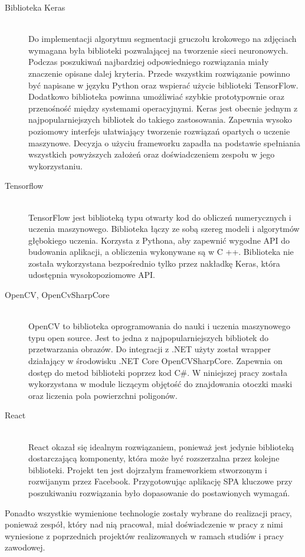 \documentclass[a4paper,11pt,twoside]{report}
\theoremstyle{definition}
\begin{document}
\begin{description}
\item [Biblioteka Keras] \hfill \\
Do implementacji algorytmu segmentacji gruczołu krokowego na zdjęciach wymagana była biblioteki pozwalającej na tworzenie sieci neuronowych. Podczas poszukiwań najbardziej odpowiedniego rozwiązania miały znaczenie opisane dalej kryteria. Przede wszystkim rozwiązanie powinno być napisane w języku Python oraz wspierać użycie biblioteki TensorFlow. Dodatkowo biblioteka powinna umożliwiać szybkie prototypownie oraz przenośność między systemami operacyjnymi. Keras jest obecnie jednym z najpopularniejszych bibliotek do takiego zastosowania. Zapewnia wysoko poziomowy interfejs ułatwiający tworzenie rozwiązań opartych o uczenie maszynowe. Decyzja o użyciu frameworku zapadła na podstawie spełniania wszystkich powyższych założeń oraz doświadczeniem zespołu w jego wykorzystaniu.
\item[Tensorflow] \hfill \\
TensorFlow jest biblioteką typu otwarty kod do obliczeń numerycznych i uczenia maszynowego. Biblioteka łączy ze sobą szereg modeli i algorytmów głębokiego uczenia. Korzysta z Pythona, aby zapewnić wygodne API do budowania aplikacji, a obliczenia wykonywane są w C ++. Biblioteka nie została wykorzystana bezpośrednio tylko przez nakładkę Keras, która udostępnia wysokopoziomowe API.
\item [OpenCV, OpenCvSharpCore] \hfill \\
OpenCV \cite{OpenCV} to biblioteka oprogramowania do nauki i uczenia maszynowego typu open source. Jest to jedna z  najpopularniejszych bibliotek do przetwarzania obrazów. Do integracji z .NET użyty został wrapper działający w środowisku .NET Core OpenCVSharpCore. Zapewnia on dostęp do metod biblioteki poprzez kod C\#. W niniejszej pracy została wykorzystana w module liczącym objętość do znajdowania otoczki maski oraz liczenia pola powierzchni poligonów.
\item [React] \hfill \\
  React okazał się idealnym rozwiązaniem, ponieważ jest jedynie biblioteką dostarczającą komponenty, która może być rozszerzalna przez kolejne biblioteki. Projekt ten jest dojrzałym frameworkiem stworzonym i rozwijanym przez Facebook. Przygotowując aplikację SPA kluczowe przy poszukiwaniu rozwiązania było dopasowanie do postawionych wymagań.
\end{description}

Ponadto wszystkie wymienione technologie zostały wybrane do realizacji pracy, ponieważ zespół, który nad nią pracował, miał doświadczenie w pracy z nimi wyniesione z poprzednich projektów realizowanych w ramach studiów i pracy zawodowej.
\end{document}
